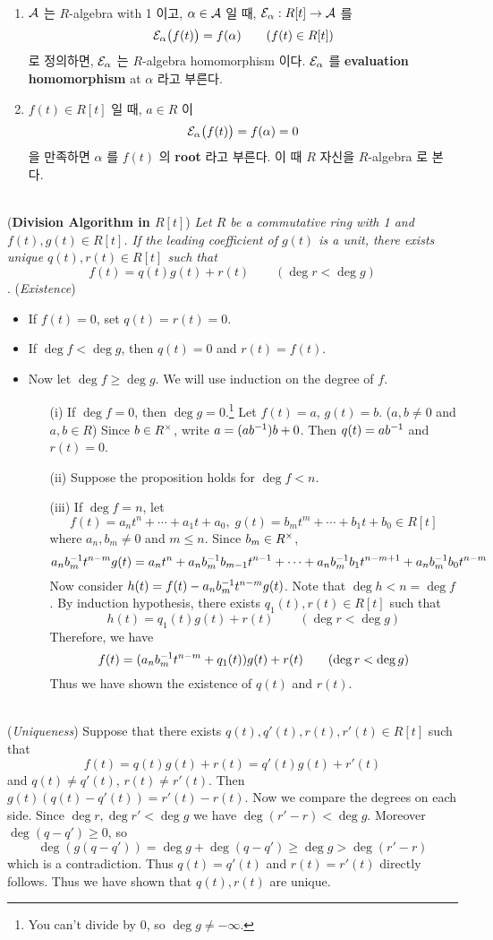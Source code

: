 \\
\begin{enumerate}
	\item $\mathcal{A}$ 는 $R$-algebra with 1 이고, $\alpha\in \mathcal{A}$ 일 때, $\mathcal{E}_\alpha:R[t]\rightarrow \mathcal{A}$ 를
	$$\mathcal{E}_\alpha\big(f(t)\big) = f(\alpha) \qquad (f(t)\in R[t])$$
	로 정의하면, $\mathcal{E}_\alpha$ 는 $R$-algebra homomorphism 이다. $\mathcal{E}_\alpha$ 를 \textbf{evaluation homomorphism} at $\alpha$ 라고 부른다.
	\item $f(t)\in R[t]$ 일 때, $a\in R$ 이 $$\mathcal{E}_\alpha\big(f(t)\big) = f(\alpha) = 0$$
	을 만족하면 $\alpha$ 를 $f(t)$ 의 \textbf{root} 라고 부른다. 이 때 $R$ 자신을 $R$-algebra 로 본다.
\end{enumerate}~
\pagebreak\\
 (\textbf{Division Algorithm in $R[t]$}) \textit{Let $R$ be a commutative ring with 1 and $f(t), g(t)\in R[t]$. If the leading coefficient of $g(t)$ is a unit, there exists unique $q(t), r(t)\in R[t]$ such that
$$f(t) = q(t)g(t)+r(t) \qquad (\deg r < \deg g)$$
}
\pf. (\textit{Existence})
\begin{itemize}
	\item If $f(t) = 0$, set $q(t) =r(t) = 0$.
	\item If $\deg f < \deg g$, then $q(t) = 0$ and $r(t) = f(t)$.
	\item Now let $\deg f \geq \deg g$. We will use induction on the degree of $f$.
	\begin{enumerate}
		\item[(i)] If $\deg f = 0$, then $\deg g = 0$.\footnote{You can't divide by 0, so $\deg g \neq -\infty$.} Let $f(t) = a$, $g(t) = b$. ($a, b\neq 0$ and $a, b\in R$) Since $b\in R^\times$, write $a = (ab^{-1})b + 0$. Then $q(t) = ab^{-1}$ and $r(t) = 0$.
		\item[(ii)] Suppose the proposition holds for $\deg f < n$.
		\item[(iii)] If $\deg f = n$, let
		$$f(t) = a_nt^n + \cdots + a_1t + a_0,\; g(t) = b_mt^m + \cdots + b_1t + b_0 \in R[t]$$
		where $a_n, b_m\neq 0$ and $m\leq n$. Since $b_m\in R^\times$,
		$$a_nb_m^{-1} t^{n-m}g(t) = a_nt^n + a_nb_m^{-1} b_{m-1}t^{n-1} + \cdots + a_nb_m^{-1} b_1 t^{n-m+1}+a_nb_m^{-1} b_0 t^{n-m}$$
		Now consider $h(t) = f(t) - a_nb_m^{-1} t^{n-m} g(t)$. Note that $\deg h < n = \deg f$. By induction hypothesis, there exists $q_1(t), r(t)\in R[t]$ such that
		$$h(t) = q_1(t)g(t) + r(t) \qquad (\deg r < \deg g)$$
		Therefore, we have
		$$f(t) = (a_nb_m^{-1} t^{n-m} + q_1(t))g(t) + r(t) \qquad (\deg r < \deg g)$$
		Thus we have shown the existence of $q(t)$ and $r(t)$.
	\end{enumerate}
\end{itemize}~\\
(\textit{Uniqueness}) Suppose that there exists $q(t), q'(t), r(t), r'(t)\in R[t]$ such that 
$$f(t) = q(t)g(t)+r(t) = q'(t)g(t)+r'(t)$$
and $q(t)\neq q'(t)$, $r(t)\neq r'(t)$.
Then $g(t)(q(t) - q'(t)) = r'(t)-r(t)$. Now we compare the degrees on each side. Since $\deg r, \deg r' < \deg g$ we have $\deg (r'-r)<\deg g$. Moreover $\deg (q-q') \geq 0$, so
$$\deg(g(q-q')) = \deg g + \deg(q - q') \geq \deg g > \deg (r' - r)$$
which is a contradiction. Thus $q(t) = q'(t)$ and $r(t)=r'(t)$ directly follows. Thus we have shown that $q(t), r(t)$ are unique.
